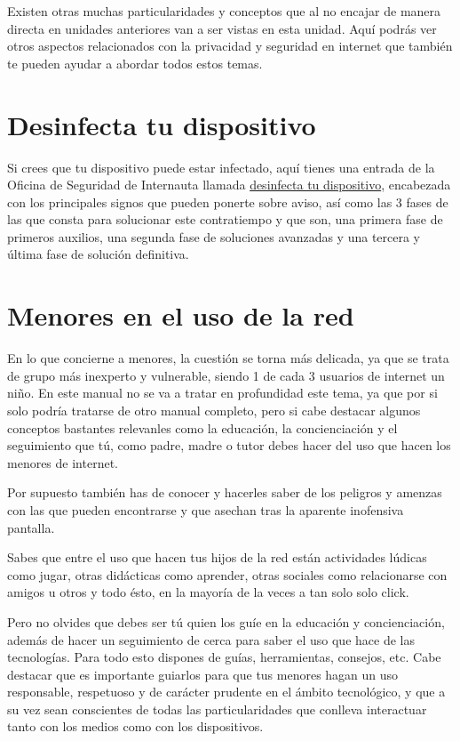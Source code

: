 \documentclass[
  spanish,
  a4paper,
  openany]{book}
\begin{document}
Existen otras muchas particularidades y conceptos que al no encajar de manera directa en unidades anteriores van a ser vistas en esta unidad. Aquí podrás ver otros aspectos relacionados con la privacidad y seguridad en internet que también te pueden ayudar a abordar todos estos temas.

\hypertarget{desinfecta-tu-dispositivo}{%
\section{Desinfecta tu dispositivo}\label{desinfecta-tu-dispositivo}}

Si crees que tu dispositivo puede estar infectado, aquí tienes una entrada de la Oficina de Seguridad de Internauta llamada \href{https://www.osi.es/es/desinfecta-tu-ordenador}{desinfecta tu dispositivo}, encabezada con los principales signos que pueden ponerte sobre aviso, así como las 3 fases de las que consta para solucionar este contratiempo y que son, una primera fase de primeros auxilios, una segunda fase de soluciones avanzadas y una tercera y última fase de solución definitiva.

\hypertarget{menores-en-el-uso-de-la-red}{%
\section{Menores en el uso de la red}\label{menores-en-el-uso-de-la-red}}

En lo que concierne a menores, la cuestión se torna más delicada, ya que se trata de grupo más inexperto y vulnerable, siendo 1 de cada 3 usuarios de internet un niño. En este manual no se va a tratar en profundidad este tema, ya que por si solo podría tratarse de otro manual completo, pero si cabe destacar algunos conceptos bastantes relevanles como la educación, la concienciación y el seguimiento que tú, como padre, madre o tutor debes hacer del uso que hacen los menores de internet.

Por supuesto también has de conocer y hacerles saber de los peligros y amenzas con las que pueden encontrarse y que asechan tras la aparente inofensiva pantalla.

Sabes que entre el uso que hacen tus hijos de la red están actividades lúdicas como jugar, otras didácticas como aprender, otras sociales como relacionarse con amigos u otros y todo ésto, en la mayoría de la veces a tan solo solo click.

Pero no olvides que debes ser tú quien los guíe en la educación y concienciación, además de hacer un seguimiento de cerca para saber el uso que hace de las tecnologías. Para todo esto dispones de guías, herramientas, consejos, etc. Cabe destacar que es importante guiarlos para que tus menores hagan un uso responsable, respetuoso y de carácter prudente en el ámbito tecnológico, y que a su vez sean conscientes de todas las particularidades que conlleva interactuar tanto con los medios como con los dispositivos.
\end{document}
